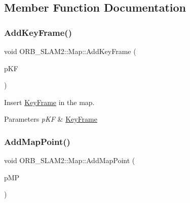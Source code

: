 \subsection{Member Function Documentation}
\mbox{\label{class_o_r_b___s_l_a_m2_1_1_map_a688de3b072e0176bb288bb70d36cd0e9}} 
\subsubsection{\texorpdfstring{Add\+Key\+Frame()}{AddKeyFrame()}}
{\footnotesize\ttfamily void O\+R\+B\+\_\+\+S\+L\+A\+M2\+::\+Map\+::\+Add\+Key\+Frame (\begin{DoxyParamCaption}\item[{\mbox{\hyperlink{class_o_r_b___s_l_a_m2_1_1_key_frame}{Key\+Frame}} $\ast$}]{p\+KF }\end{DoxyParamCaption})}



Insert \mbox{\hyperlink{class_o_r_b___s_l_a_m2_1_1_key_frame}{Key\+Frame}} in the map. 


\begin{DoxyParams}{Parameters}
{\em p\+KF} & \mbox{\hyperlink{class_o_r_b___s_l_a_m2_1_1_key_frame}{Key\+Frame}} \\
\hline
\end{DoxyParams}
\mbox{\label{class_o_r_b___s_l_a_m2_1_1_map_a2d8e1b4376778dfe32df90ec00b599e3}} 
\subsubsection{\texorpdfstring{Add\+Map\+Point()}{AddMapPoint()}}
{\footnotesize\ttfamily void O\+R\+B\+\_\+\+S\+L\+A\+M2\+::\+Map\+::\+Add\+Map\+Point (\begin{DoxyParamCaption}\item[{\mbox{\hyperlink{class_o_r_b___s_l_a_m2_1_1_map_point}{Map\+Point}} $\ast$}]{p\+MP }\end{DoxyParamCaption})}




